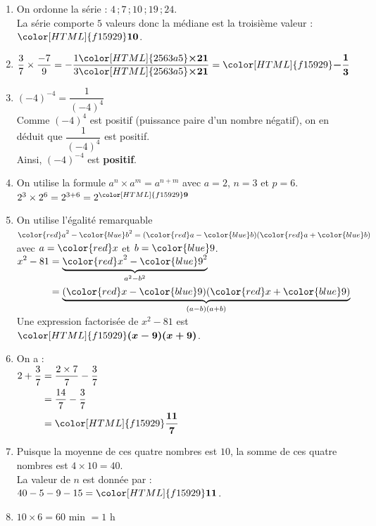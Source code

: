 \documentclass[a4paper,11pt,landscape,exos]{nsi} %
\begin{document}
\begin{multicols}{2}
\begin{enumerate}[itemsep=.75em]
\item On ordonne la série :  $4$\,;\,$7$\,;\,$10$\,;\,$19$\,;\,$24$.\\
      La série comporte $5$ valeurs donc la médiane est la troisième valeur : ${\color[HTML]{f15929}\boldsymbol{10}}$.
\item $\dfrac{3}{7}\times \dfrac{-7}{9}=-\dfrac{1{\color[HTML]{2563a5}\boldsymbol{\times21}} }{3{\color[HTML]{2563a5}\boldsymbol{\times21}}}={\color[HTML]{f15929}\boldsymbol{-\dfrac{1}{3}}}$
\item $(-4)^{-4}=\dfrac{1}{(-4)^{4}}$\\
     Comme  $(-4)^{4}$ est  positif (puissance paire d'un nombre négatif), on en déduit que  $\dfrac{1}{(-4)^{4}}$ est positif.\\
    Ainsi, $(-4)^{-4}$ est {\bfseries \color[HTML]{f15929}positif}.
\item On utilise la formule $a^n\times a^m=a^{n+m}$ avec $a=2$, $n=3$ et $p=6$.\\
            $2^{3}\times 2^{6}=2^{3+6}=2^{{\color[HTML]{f15929}\boldsymbol{9}}}$
\item On utilise l'égalité remarquable ${\color{red} a}^2-{\color{blue} b}^2=({\color{red} a}-{\color{blue} b})({\color{red} a}+{\color{blue} b})$ avec $a={\color{red} x}$  et $b={\color{blue} 9}$.\\$\begin{aligned}
 x^2-81&=\underbrace{{\color{red} x}^2-{\color{blue} 9}^2}_{a^2-b^2}\\
 &=\underbrace{({\color{red} x}-{\color{blue} 9})({\color{red} x}+{\color{blue} 9})}_{(a-b)(a+b)}
 \end{aligned}$ \\
    Une expression factorisée de $x^2-81$ est ${\color[HTML]{f15929}\boldsymbol{(x-9)(x+9)}}$.
\item On a : \\$\begin{aligned}
      2+\dfrac{3}{7} &= \dfrac{2 \times 7}{7} - \dfrac{3}{7} \\
      &= \dfrac{14}{7} - \dfrac{3}{7}\\
      &  ={\color[HTML]{f15929}\boldsymbol{\dfrac{11}{7}}}
      \end{aligned}$
\item Puisque la moyenne de ces quatre nombres est $10$, la somme de ces quatre nombres est $4\times 10=40$.\\
             La valeur de $n$ est donnée par :  $40-5-9-15={\color[HTML]{f15929}\boldsymbol{11}}$.
\item $10\times 6= 60$ min $=1$ h\\

\end{enumerate}
\end{multicols}
\end{document}
